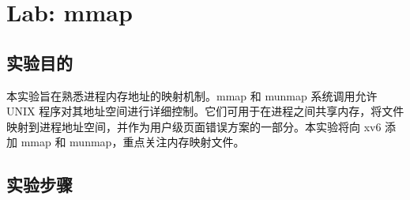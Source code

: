 \section{Lab: mmap}

\subsection{实验目的}
本实验旨在熟悉进程内存地址的映射机制。mmap 和 munmap 系统调用允许 UNIX 程序对其地址空间进行详细控制。它们可用于在进程之间共享内存，将文件映射到进程地址空间，并作为用户级页面错误方案的一部分。本实验将向 xv6 添加 mmap 和 munmap，重点关注内存映射文件。

\subsection{实验步骤}

